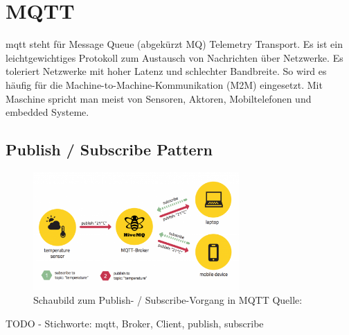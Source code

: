 \section{MQTT}
\label{sec:mqtt}
\acrshort{mqtt} steht für Message Queue (abgekürzt MQ) Telemetry Transport. Es ist ein leichtgewichtiges Protokoll zum Austausch von Nachrichten über Netzwerke. Es toleriert Netzwerke mit hoher Latenz und schlechter Bandbreite. So wird es häufig für die Machine-to-Machine-Kommunikation (M2M) eingesetzt. Mit Maschine spricht man meist von Sensoren, Aktoren, Mobiltelefonen und embedded Systeme. 

\subsection{Publish / Subscribe Pattern}

\begin{figure}[H]
	\centering
	\includegraphics[width=0.7\textwidth]{img/mqtt-basics-by_hivemq.png}
	\caption{Schaubild zum Publish- / Subscribe-Vorgang in MQTT Quelle: \cite{hivemq.com-mqtt-essentials-publish-subscribe}}
	\label{fig:junit-example}
\end{figure}

TODO - Stichworte: \acrshort{mqtt}, Broker, Client, publish, subscribe
